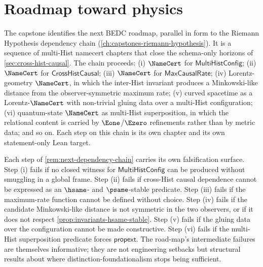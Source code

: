 \section{Roadmap toward physics}
\label{sec:roadmap-toward-physics}

\begin{remark}
\label{rem:next-dependency-chain}
The capstone identifies the next BEDC roadmap, parallel in form to the Riemann Hypothesis dependency chain (\autoref{ch:capstones-riemann-hypothesis}). It is a sequence of multi-Hist namecert chapters that close the schema-only horizons of \autoref{sec:cross-hist-causal}. The chain proceeds: (i) \(\NameCert\) for \(\mathsf{MultiHistConfig}\); (ii) \(\NameCert\) for \(\mathsf{CrossHistCausal}\); (iii) \(\NameCert\) for \(\mathsf{MaxCausalRate}\); (iv) Lorentz-geometry \(\NameCert\), in which the inter-Hist invariant produces a Minkowski-like distance from the observer-symmetric maximum rate; (v) curved spacetime as a Lorentz-\(\NameCert\) with non-trivial gluing data over a multi-Hist configuration; (vi) quantum-state \(\NameCert\) as multi-Hist superposition, in which the relational content is carried by \(\Eone\)/\(\Ezero\) refinements rather than by metric data; and so on. Each step on this chain is its own chapter and its own statement-only Lean target.
\end{remark}

\begin{remark}
\label{rem:falsification-surfaces}
Each step of \autoref{rem:next-dependency-chain} carries its own falsification surface. Step (i) fails if no closed witness for \(\mathsf{MultiHistConfig}\) can be produced without smuggling in a global frame. Step (ii) fails if cross-Hist causal dependence cannot be expressed as an \(\hsame\)- and \(\psame\)-stable predicate. Step (iii) fails if the maximum-rate function cannot be defined without choice. Step (iv) fails if the candidate Minkowski-like distance is not symmetric in the two observers, or if it does not respect \autoref{prop:invariants-hsame-stable}. Step (v) fails if the gluing data over the configuration cannot be made constructive. Step (vi) fails if the multi-Hist superposition predicate forces \(\mathsf{propext}\). The road-map's intermediate failures are themselves informative; they are not engineering setbacks but structural results about where distinction-foundationalism stops being sufficient.
\end{remark}


